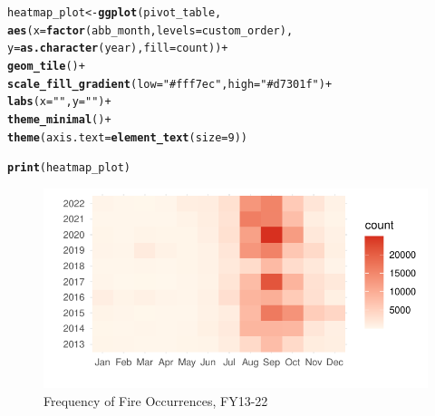\documentclass{article}\usepackage[]{graphicx}\usepackage[]{xcolor}
\makeatletter
\def\maxwidth{ %
  \ifdim\Gin@nat@width>\linewidth
    \linewidth
  \else
    \Gin@nat@width
  \fi
}
\newcommand{\hlnum}[1]{\textcolor[rgb]{0.686,0.059,0.569}{#1}}%
\newcommand{\hlstr}[1]{\textcolor[rgb]{0.192,0.494,0.8}{#1}}%
\newcommand{\hlopt}[1]{\textcolor[rgb]{0,0,0}{#1}}%
\newcommand{\hlstd}[1]{\textcolor[rgb]{0.345,0.345,0.345}{#1}}%
\newcommand{\hlkwb}[1]{\textcolor[rgb]{0.69,0.353,0.396}{#1}}%
\newcommand{\hlkwc}[1]{\textcolor[rgb]{0.333,0.667,0.333}{#1}}%
\newcommand{\hlkwd}[1]{\textcolor[rgb]{0.737,0.353,0.396}{\textbf{#1}}}%
\newenvironment{kframe}{%
 \def\at@end@of@kframe{}%
 \ifinner\ifhmode%
  \def\at@end@of@kframe{\end{minipage}}%
  \begin{minipage}{\columnwidth}%
 \fi\fi%
 \def\FrameCommand##1{\hskip\@totalleftmargin \hskip-\fboxsep
 \colorbox{shadecolor}{##1}\hskip-\fboxsep
     \hskip-\linewidth \hskip-\@totalleftmargin \hskip\columnwidth}%
 \MakeFramed {\advance\hsize-\width
   \@totalleftmargin\z@ \linewidth\hsize
   \@setminipage}}%
 {\par\unskip\endMakeFramed%
 \at@end@of@kframe}
\newenvironment{knitrout}{}{} %
\makeatother
\begin{document}
\begin{knitrout}\scriptsize
{}\color{fgcolor}\begin{kframe}
\begin{alltt}
\hlstd{heatmap_plot} \hlkwb{<-} \hlkwd{ggplot}\hlstd{(pivot_table,}
                       \hlkwd{aes}\hlstd{(}\hlkwc{x} \hlstd{=} \hlkwd{factor}\hlstd{(abb_month,} \hlkwc{levels} \hlstd{= custom_order),}
                           \hlkwc{y} \hlstd{=} \hlkwd{as.character}\hlstd{(year),} \hlkwc{fill} \hlstd{= count))} \hlopt{+}
  \hlkwd{geom_tile}\hlstd{()} \hlopt{+}
  \hlkwd{scale_fill_gradient}\hlstd{(}\hlkwc{low} \hlstd{=} \hlstr{"#fff7ec"}\hlstd{,} \hlkwc{high} \hlstd{=} \hlstr{"#d7301f"}\hlstd{)} \hlopt{+}
  \hlkwd{labs}\hlstd{(}\hlkwc{x} \hlstd{=} \hlstr{" "}\hlstd{,} \hlkwc{y} \hlstd{=} \hlstr{" "}\hlstd{)} \hlopt{+}
  \hlkwd{theme_minimal}\hlstd{()} \hlopt{+}
  \hlkwd{theme}\hlstd{(}\hlkwc{axis.text} \hlstd{=} \hlkwd{element_text}\hlstd{(}\hlkwc{size} \hlstd{=} \hlnum{9}\hlstd{))}

\hlkwd{print}\hlstd{(heatmap_plot)}
\end{alltt}
\end{kframe}\begin{figure}[H]

{\centering \includegraphics[width=\maxwidth]{figure/beamer-fire-by-months-fy13-22-1} 

}

\caption[Frequency of Fire Occurrences, FY13-22]{Frequency of Fire Occurrences, FY13-22}\label{fig:fire-by-months-fy13-22}
\end{figure}

\end{knitrout}
\end{document}
